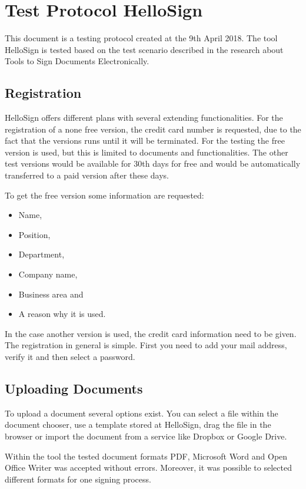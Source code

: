 \section{Test Protocol HelloSign} \label{sec:hellosign}
This document is a testing protocol created at the 9th April 2018. The tool HelloSign is tested based on the test scenario described in the research about Tools to Sign Documents Electronically.

\subsection{Registration}
HelloSign offers different plans with several extending functionalities. For the registration of a none free version, the credit card number is requested, due to the fact that the versions runs until it will be terminated. For the testing the free version is used, but this is limited to documents and functionalities. The other test versions would be available for 30th days for free and would be automatically transferred to a paid version after these days.

To get the free version some information are requested:
\begin{itemize}
	\item Name,
	\item Position,
	\item Department,
	\item Company name,
	\item Business area and
	\item A reason why it is used.
\end{itemize}
In the case another version is used, the credit card information need to be given. \newline
The registration in general is simple. First you need to add your mail address, verify it and then select a password.

\subsection{Uploading Documents}
To upload a document several options exist. You can select a file within the document chooser, use a template stored at HelloSign, drag the file in the browser or import the document from a service like Dropbox or Google Drive.

Within the tool the tested document formats \gls{PDF}, Microsoft Word and Open Office Writer was accepted without errors. Moreover, it was possible to selected different formats for one signing process.

